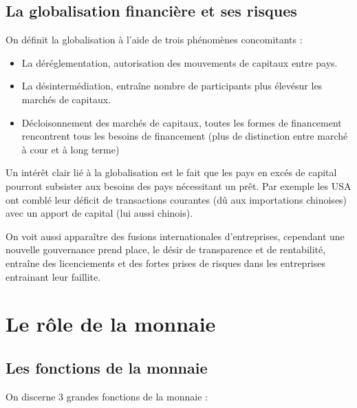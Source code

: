 
\subsection{La globalisation financière et ses risques} %
\label{sub:la_globalisation_financiere_et_ses_risques}

On définit la globalisation à l'aide de trois phénomènes concomitants : 
\begin{itemize}[label=]
	\item La déréglementation, autorisation des mouvements de capitaux entre pays.
	\item La désintermédiation, entraîne nombre de participants plus élevésur les marchés de capitaux.
	\item Décloisonnement des marchés de capitaux, toutes les formes de financement rencontrent tous les besoins de financement (plus de distinction entre
	marché à cour et à long terme) 
\end{itemize}

Un intérêt clair lié à la globalisation est le fait que les pays en excés de capital pourront subsister aux besoins des pays nécessitant un prêt. Par 
exemple les USA ont comblé leur déficit de transactions courantes (dû aux importations chinoises) avec un apport de capital (lui aussi chinois).

On voit aussi apparaître des fusions internationales d'entreprises, cependant une nouvelle gouvernance prend place, le désir de transparence et de rentabilité,
entraîne des licenciements et des fortes prises de risques dans les entreprises entrainant leur faillite.




\section{Le rôle de la monnaie} %
\label{sec:le_role_de_la_monnaie}

\subsection{Les fonctions de la monnaie} %
\label{sub:les_fonctions_de_la_monnaie}

On discerne 3 grandes fonctions de la monnaie : 

